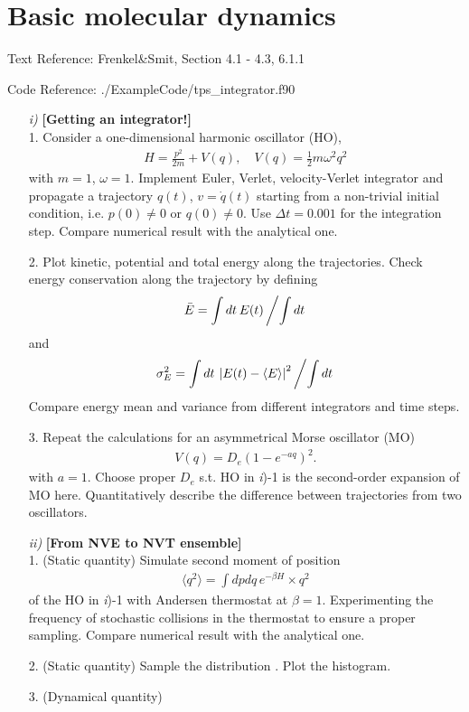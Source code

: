 \documentclass[aip,graphicx,sd, amsmath,amssymb]{revtex4-1}
\begin{document}
\section{Basic molecular dynamics}
Text Reference: Frenkel\&Smit, Section 4.1 - 4.3, 6.1.1

Code Reference: ./ExampleCode/tps\_integrator.f90

\begin{enumerate}
\item[\it{i})] \textbf{[Getting an integrator!]} \\
1. Consider a one-dimensional harmonic oscillator (HO),
\begin{align}
H = \frac{p^2}{2m} + V(q), \quad V(q)=\frac12 m \omega^2 q^2
\end{align}
with $m=1$, $\omega=1$. Implement Euler, Verlet, velocity-Verlet integrator and propagate a trajectory $q(t)$, $v=\dot{q}(t)$ starting from a non-trivial initial condition, i.e. $p(0) \neq 0$ or $q(0) \neq 0$. Use $\Delta t=0.001$ for the integration step. Compare numerical result with the analytical one.

2. Plot kinetic, potential and total energy along the trajectories. Check energy conservation along the trajectory by defining
\begin{align}
\bar{E} = \int  dt \hspace{2pt} E(t) \left/ \int dt \right.
\end{align}
and 
\begin{align}
\sigma_E^2 = \int  dt \hspace{2pt} \left| E(t)- \langle E \rangle \right|^2  \left/ \int dt \right.
\end{align}
Compare energy mean and variance from different integrators and time steps.

3. Repeat the calculations for an asymmetrical Morse oscillator (MO)
\begin{align}
V(q) = D_e \left( 1- e^{-a q} \right)^2.
\end{align}
with $a=1$. Choose proper $D_e$ s.t. HO in {\it{i}})-1 is the second-order expansion of MO here. Quantitatively describe the difference between trajectories from two oscillators.

\item[\it{ii})] \textbf{[From NVE to NVT ensemble]} \\
1. (Static quantity) Simulate second moment of position 
\begin{align}
 \langle q^2 \rangle = \int dp dq  \hspace{2pt} e^{-\beta H} \times q^2
\end{align}
of the HO  in {\it{i}})-1 with Andersen thermostat at $\beta=1$. Experimenting the frequency of stochastic collisions in the thermostat to ensure a proper sampling. Compare numerical result with the analytical one.

2. (Static quantity) Sample the distribution . Plot the histogram.

3. (Dynamical quantity)

\end{enumerate}
\end{document}
